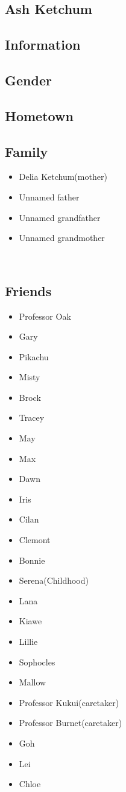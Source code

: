 \documentclass[a4paper,12pt]{article}
\begin{document}
\subsection*{Ash Ketchum}\n\n\subsection*{Information}\n\n\subsection*{Gender}\n\n\subsection*{Hometown}\n\n\subsection*{Family}\n\n\begin{itemize}
\item Delia Ketchum(mother)
\item Unnamed father
\item Unnamed grandfather
\item Unnamed grandmother
\end{itemize}\\ \par \vspace{0.5cm}

\subsection*{Friends}\n\n\begin{itemize}
\item Professor Oak
\item Gary
\item Pikachu
\item Misty
\item Brock
\item Tracey
\item May
\item Max
\item Dawn
\item Iris
\item Cilan
\item Clemont
\item Bonnie
\item Serena(Childhood)
\item Lana
\item Kiawe
\item Lillie
\item Sophocles
\item Mallow
\item Professor Kukui(caretaker)
\item Professor Burnet(caretaker)
\item Goh
\item Lei
\item Chloe
\end{itemize}\\ \par \vspace{0.5cm}
\end{document}
